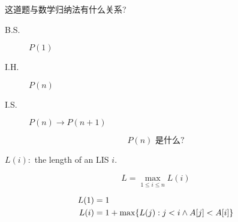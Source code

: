 \begin{frame}{}
  \centerline{ 这道题与数学归纳法有什么关系?}

  \vspace{0.30cm}
  \pause
  \begin{description}
    \item[B.S.] $P(1)$
    \item[I.H.] $P(n)$
    \item[I.S.] $P(n) \to P(n+1)$
  \end{description}

  \[
    P(n) \text{ 是什么?}
  \]
\end{frame}

\begin{frame}{}
  \centerline{$L(i):$ the length of an LIS  $i$.}

  \pause
  \[
    L = \max_{1 \le i \le n} L(i)
  \]

  \pause
  \begin{align*}
    L(1) &= 1 \\
    L(i) &= 1 + \max\{L(j): j < i \land A[j] < A[i]\}
  \end{align*}

  \pause
\end{frame}
